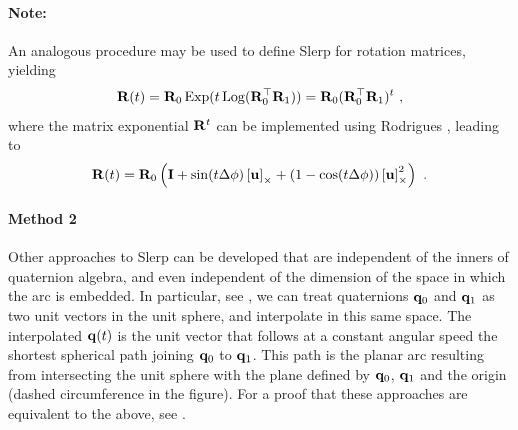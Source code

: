 \paragraph{Note:} An analogous procedure may be used to define Slerp for rotation matrices, yielding
%
\begin{align}\label{equ:Rslerp}
{\bf R}(t)= {\bf R}_0\operatorname*{Exp}(t\operatorname*{Log}({\bf R}_0^{\top}{\bf R}_1))={\bf R}_0({\bf R}_0^{\top}{\bf R}_1)^t 
~,
\end{align}
%
where the matrix exponential ${\bf R}^t$ can be implemented using Rodrigues , leading to
%
\begin{align}
{\bf R}(t)= {\bf R}_0 \left({\bf I} + \sin(t\Delta\phi)\left[{\bf u}\right]_\times + (1-\cos(t\Delta\phi))\left[{\bf u}\right]_\times^2\right)
~.
\end{align}


\paragraph{Method 2}
Other approaches to Slerp can be developed that are independent of the inners of quaternion algebra, and even independent of the dimension of the space in which the arc is embedded. 
In particular, see , we can treat quaternions ${\bf q}_0$ and ${\bf q}_1$ as two unit vectors in the unit sphere, and interpolate in this same space. 
The interpolated ${\bf q}(t)$ is the unit vector that follows at a constant angular speed
the shortest spherical path joining ${\bf q}_0$ to ${\bf q}_1$.
This path is the planar arc resulting from intersecting the unit sphere with the plane defined by ${\bf q}_0$, ${\bf q}_1$ and the origin (dashed circumference in the figure).
For a proof that these approaches are equivalent to the above, see \cite{DAM-1998}.

